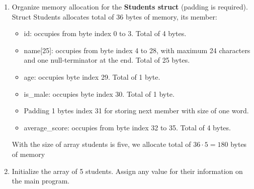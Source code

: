 \documentclass[12pt,a4paper]{article}
\begin{document}
\begin{enumerate}
  \item Organize memory allocation for the \textbf{Students struct} (padding is required). \\

        Struct Students allocates total of 36 bytes of memory, its member:
        \begin{itemize}
          \item id: occupies from byte index 0 to 3. Total of 4 bytes.
          \item name[25]: occupies from byte index 4 to 28, with maximum 24 characters and one null-terminator at the end. Total of 25 bytes.
          \item age: occupies byte index 29. Total of 1 byte.
          \item is\_male: occupies byte index 30. Total of 1 byte.
          \item Padding 1 bytes index 31 for storing next member with size of one word.
          \item average\_score: occupies from byte index 32 to 35. Total of 4 bytes.
        \end{itemize}

        With the size of array students is five, we allocate total of $36 \cdot 5 = 180$ bytes of memory

  \item Initialize the array of 5 students. Assign any value for their information on the main program. \\


\end{enumerate}
\end{document}

